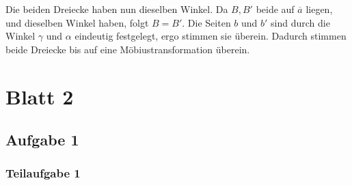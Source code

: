 \documentclass{book}
\begin{document}
\begin{Beweis}{}
\begin{enumerate}[(i)]
		Die beiden Dreiecke haben nun dieselben Winkel. Da $B,B'$ beide auf $\overline{ a}$ liegen, und dieselben Winkel haben, folgt $B = B'$. Die Seiten $b$ und $b'$ sind durch die Winkel $\gamma$ und $\alpha$ eindeutig festgelegt, ergo stimmen sie überein. Dadurch stimmen beide Dreiecke bis auf eine Möbiustransformation überein. 
	\end{enumerate}
\end{Beweis}

\newpage
\section{Blatt 2}
\subsection{Aufgabe 1}
\subsubsection{Teilaufgabe 1}
\end{document}
